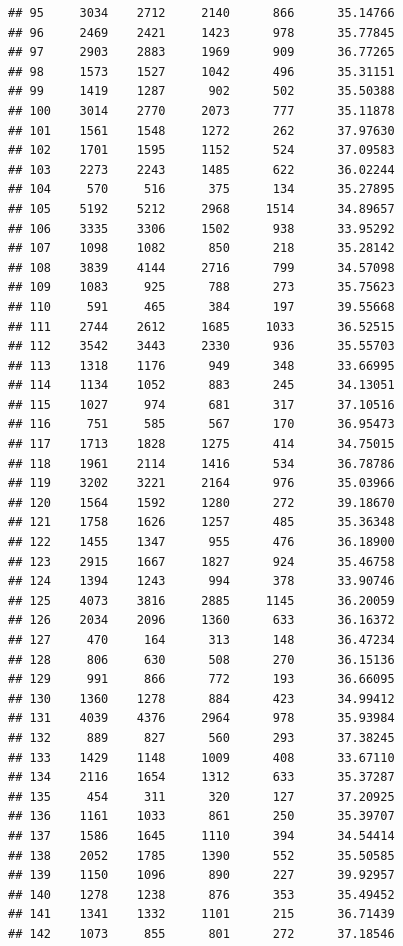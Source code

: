 \documentclass[
]{article}
\begin{document}
\begin{verbatim}
## 95     3034    2712     2140      866      35.14766
## 96     2469    2421     1423      978      35.77845
## 97     2903    2883     1969      909      36.77265
## 98     1573    1527     1042      496      35.31151
## 99     1419    1287      902      502      35.50388
## 100    3014    2770     2073      777      35.11878
## 101    1561    1548     1272      262      37.97630
## 102    1701    1595     1152      524      37.09583
## 103    2273    2243     1485      622      36.02244
## 104     570     516      375      134      35.27895
## 105    5192    5212     2968     1514      34.89657
## 106    3335    3306     1502      938      33.95292
## 107    1098    1082      850      218      35.28142
## 108    3839    4144     2716      799      34.57098
## 109    1083     925      788      273      35.75623
## 110     591     465      384      197      39.55668
## 111    2744    2612     1685     1033      36.52515
## 112    3542    3443     2330      936      35.55703
## 113    1318    1176      949      348      33.66995
## 114    1134    1052      883      245      34.13051
## 115    1027     974      681      317      37.10516
## 116     751     585      567      170      36.95473
## 117    1713    1828     1275      414      34.75015
## 118    1961    2114     1416      534      36.78786
## 119    3202    3221     2164      976      35.03966
## 120    1564    1592     1280      272      39.18670
## 121    1758    1626     1257      485      35.36348
## 122    1455    1347      955      476      36.18900
## 123    2915    1667     1827      924      35.46758
## 124    1394    1243      994      378      33.90746
## 125    4073    3816     2885     1145      36.20059
## 126    2034    2096     1360      633      36.16372
## 127     470     164      313      148      36.47234
## 128     806     630      508      270      36.15136
## 129     991     866      772      193      36.66095
## 130    1360    1278      884      423      34.99412
## 131    4039    4376     2964      978      35.93984
## 132     889     827      560      293      37.38245
## 133    1429    1148     1009      408      33.67110
## 134    2116    1654     1312      633      35.37287
## 135     454     311      320      127      37.20925
## 136    1161    1033      861      250      35.39707
## 137    1586    1645     1110      394      34.54414
## 138    2052    1785     1390      552      35.50585
## 139    1150    1096      890      227      39.92957
## 140    1278    1238      876      353      35.49452
## 141    1341    1332     1101      215      36.71439
## 142    1073     855      801      272      37.18546

\end{verbatim}
\end{document}
